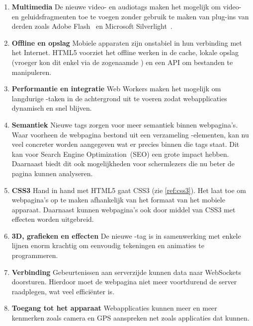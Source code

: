 \begin{enumerate}
\item \textbf{Multimedia} 
De nieuwe video- en audiotags maken het mogelijk om video- en geluidsfragmenten toe te voegen zonder gebruik te maken van plug-ins van derden zoals Adobe Flash~\cite{Adobe2013} en Microsoft Silverlight~\cite{Microsoft2013}.

\item \textbf{Offline en opslag}  
Mobiele apparaten zijn onstabiel in hun verbinding met het Internet. HTML5 voorziet het offline werken in de cache, lokale opslag (vroeger kon dit enkel via de zogenaamde ) en een API om bestanden te manipuleren.

\item \textbf{Performantie en integratie}
Web Workers maken het mogelijk om langdurige \js{}-taken in de achtergrond uit te voeren zodat webapplicaties dynamisch en snel blijven.

\item \textbf{Semantiek}
Nieuwe tags zorgen voor meer semantiek binnen webpagina's. 
Waar voorheen de webpagina bestond uit een verzameling -elementen, kan nu veel concreter worden aangegeven wat er precies binnen die tags staat. 
Dit kan voor Search Engine Optimization~(SEO) een grote impact hebben. 
Daarnaast biedt dit ook mogelijkheden voor schermlezers die nu beter de pagina kunnen analyseren.

\item \textbf{CSS3}
Hand in hand met HTML5 gaat CSS3 (zie \ref{ref:css3}). 
Het laat toe om webpagina's op te maken afhankelijk van het formaat van het mobiele apparaat. 
Daarnaast kunnen webpagina's ook door middel van CSS3 met effecten worden uitgebreid. 

\item \textbf{3D, grafieken en effecten}
De nieuwe -tag is in samenwerking met enkele lijnen \js{} enorm krachtig om eenvoudig tekeningen en animaties te programmeren.

\item \textbf{Verbinding}
Gebeurtenissen aan serverzijde kunnen data naar WebSockets doorsturen. 
Hierdoor moet de webpagina niet meer voortdurend de server raadplegen, wat veel efficiënter is.

\item \textbf{Toegang tot het apparaat}
Webapplicaties kunnen meer en meer kenmerken zoals camera en GPS aanspreken net zoals  applicaties dat kunnen. 
\end{enumerate}

